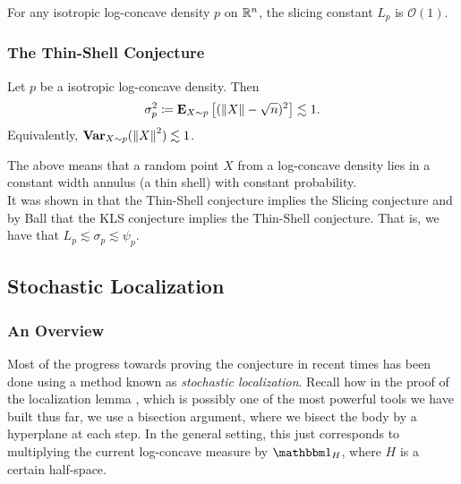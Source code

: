 \begin{fcon}
	\label{slicing conjecture}
	For any isotropic log-concave density $p$ on $\mathbb{R}^n$, the slicing constant $L_p$ is $\mathcal{O}(1)$.
\end{fcon}

\subsubsection{The Thin-Shell Conjecture}

\begin{fcon}
	\label{con: thin shell conjecture}
	Let $p$ be a isotropic log-concave density. Then
	\[ \sigma_p^2 \coloneqq \textbf{E}_{X\sim p}\left[(\left\lVert X\right\rVert-\sqrt{n})^2\right] \lesssim 1. \]
	Equivalently, $\operatorname{\textbf{Var}}_{X\sim p}(\left\lVert X\right\rVert^2) \lesssim 1$.
\end{fcon}

The above means that a random point $X$ from a log-concave density lies in a constant width annulus (a thin shell) with constant probability.\\

It was shown in \cite{Eldan2010ApproximatelyGM} that the Thin-Shell conjecture implies the Slicing conjecture and by Ball that the KLS conjecture implies the Thin-Shell conjecture. That is, we have that $L_p \lesssim \sigma_p \lesssim \psi_p$.

\subsection{Stochastic Localization}

\subsubsection{An Overview}

Most of the progress towards proving the conjecture in recent times has been done using a method known as \textit{stochastic localization}. Recall how in the proof of the localization lemma , which is possibly one of the most powerful tools we have built thus far, we use a bisection argument, where we bisect the body by a hyperplane at each step. In the general setting, this just corresponds to multiplying the current log-concave measure by $\indic_{H}$, where $H$ is a certain half-space.\\


